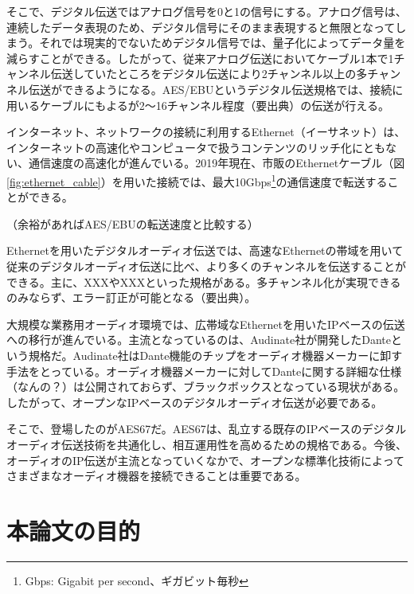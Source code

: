 そこで、デジタル伝送ではアナログ信号を0と1の信号にする。アナログ信号は、連続したデータ表現のため、デジタル信号にそのまま表現すると無限となってしまう。それでは現実的でないためデジタル信号では、量子化によってデータ量を減らすことができる\cite{analog-io}。したがって、従来アナログ伝送においてケーブル1本で1チャンネル伝送していたところをデジタル伝送により2チャンネル以上の多チャンネル伝送ができるようになる。AES/EBUというデジタル伝送規格では、接続に用いるケーブルにもよるが2〜16チャンネル程度（要出典）の伝送が行える。

インターネット、ネットワークの接続に利用するEthernet（イーサネット）は、インターネットの高速化やコンピュータで扱うコンテンツのリッチ化にともない、通信速度の高速化が進んでいる。2019年現在、市販のEthernetケーブル（図\ref{fig:ethernet_cable}）を用いた接続では、最大10Gbps\footnote{Gbps: Gigabit per second、ギガビット毎秒}の通信速度で転送することができる。

（余裕があればAES/EBUの転送速度と比較する）


Ethernetを用いたデジタルオーディオ伝送では、高速なEthernetの帯域を用いて従来のデジタルオーディオ伝送に比べ、より多くのチャンネルを伝送することができる。主に、XXXやXXXといった規格がある。多チャンネル化が実現できるのみならず、エラー訂正が可能となる（要出典）。

大規模な業務用オーディオ環境では、広帯域なEthernetを用いたIPベースの伝送への移行が進んでいる。主流となっているのは、Audinate社が開発したDanteという規格だ。Audinate社はDante機能のチップをオーディオ機器メーカーに卸す手法をとっている。オーディオ機器メーカーに対してDanteに関する詳細な仕様（なんの？）は公開されておらず、ブラックボックスとなっている現状がある。したがって、オープンなIPベースのデジタルオーディオ伝送が必要である。

そこで、登場したのがAES67だ。AES67は、乱立する既存のIPベースのデジタルオーディオ伝送技術を共通化し、相互運用性を高めるための規格である。今後、オーディオのIP伝送が主流となっていくなかで、オープンな標準化技術によってさまざまなオーディオ機器を接続できることは重要である。

\section{本論文の目的}

